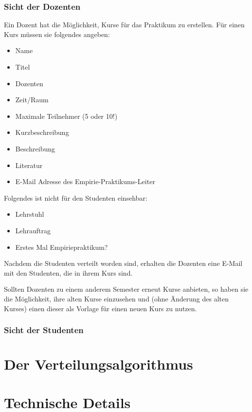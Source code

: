 \documentclass[12pt,a4paper]{article}
\begin{document}
                
            \subsubsection{Sicht der Dozenten}
            Ein Dozent hat die Möglichkeit, Kurse für das Praktikum zu erstellen. Für einen Kurs müssen sie folgendes angeben:
            \begin{itemize}
            \item Name
            \item Titel
            \item Dozenten
            \item Zeit/Raum
            \item Maximale Teilnehmer (5 oder 10!)
            \item Kurzbeschreibung
            \item Beschreibung
            \item Literatur
            \item E-Mail Adresse des Empirie-Praktikums-Leiter %
            \end{itemize}
            Folgendes ist nicht für den Studenten einsehbar:
            \begin{itemize}
            \item Lehrstuhl
            \item Lehrauftrag
            \item Erstes Mal Empiriepraktikum?
            \end{itemize}
            
            Nachdem die Studenten verteilt worden sind, erhalten die Dozenten eine E-Mail mit den Studenten, die in ihrem Kurs sind.
            
            Sollten Dozenten zu einem anderem Semester erneut Kurse anbieten, so haben sie die Möglichkeit, ihre alten Kurse einzusehen und (ohne Änderung des alten Kurses) einen dieser als Vorlage für einen neuen Kurs zu nutzen.
            

                
            \subsubsection{Sicht der Studenten}
            
    
    \section{Der Verteilungsalgorithmus}    
    
    \section{Technische Details}
    
    
\end{document}

